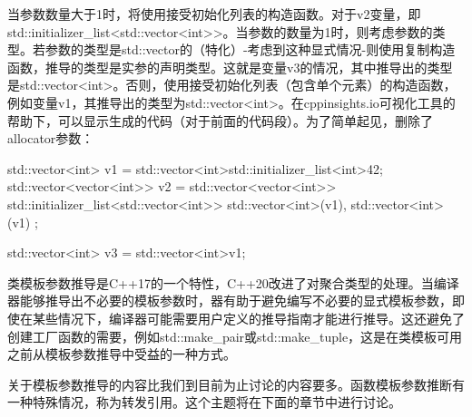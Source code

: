 当参数数量大于1时，将使用接受初始化列表的构造函数。对于v2变量，即std::initializer\_list<std::vector<int>{}>。当参数的数量为1时，则考虑参数的类型。若参数的类型是std::vector的（特化）-考虑到这种显式情况-则使用复制构造函数，推导的类型是实参的声明类型。这就是变量v3的情况，其中推导出的类型是std::vector<int>。否则，使用接受初始化列表（包含单个元素）的构造函数，例如变量v1，其推导出的类型为std::vector<int>。在cppinsights.io可视化工具的帮助下，可以显示生成的代码（对于前面的代码段）。为了简单起见，删除了allocator参数：

\begin{cpp}
std::vector<int> v1 =
std::vector<int>{std::initializer_list<int>{42}};
std::vector<vector<int>> v2 =
std::vector<vector<int>>{
	std::initializer_list<std::vector<int>>{
		std::vector<int>(v1),
			std::vector<int>(v1)
		}
	};

std::vector<int> v3 = std::vector<int>{v1};
\end{cpp}

类模板参数推导是C++17的一个特性，C++20改进了对聚合类型的处理。当编译器能够推导出不必要的模板参数时，器有助于避免编写不必要的显式模板参数，即使在某些情况下，编译器可能需要用户定义的推导指南才能进行推导。这还避免了创建工厂函数的需要，例如std::make\_pair或std::make\_tuple，这是在类模板可用之前从模板参数推导中受益的一种方式。

关于模板参数推导的内容比我们到目前为止讨论的内容要多。函数模板参数推断有一种特殊情况，称为转发引用。这个主题将在下面的章节中进行讨论。







